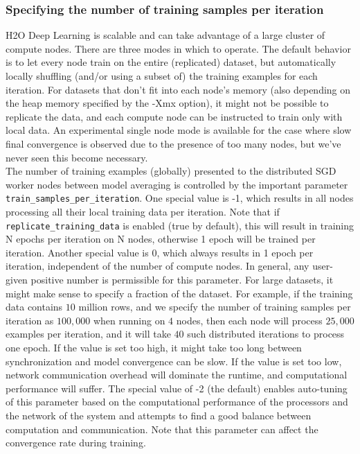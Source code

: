 \documentclass[11pt]{article}
\begin{document}
\subsubsection{Specifying the number of training samples per iteration} \label{2.2.4}
H2O Deep Learning is scalable and can take advantage of a large cluster of compute nodes. There are three modes in which to operate. The default behavior is to let every node train on the entire (replicated) dataset, but automatically locally shuffling (and/or using a subset of) the training examples for each iteration. For datasets that don't fit into each node's memory (also depending on the heap memory specified by the -Xmx option), it might not be possible to replicate the data, and each compute node can be instructed to train only with local data. An experimental single node mode is available for the case where slow final convergence is observed due to the presence of too many nodes, but we've never seen this become necessary.
\\
The number of training examples (globally) presented to the distributed SGD worker nodes between model averaging is controlled by the important parameter \texttt{train\_samples\_per\_iteration}. One special value is -1, which results in all nodes processing all their local training data per iteration. Note that if \texttt{replicate\_training\_data} is enabled (true by default), this will result in training N epochs per iteration on N nodes, otherwise 1 epoch will be trained per iteration. Another special value is 0, which always results in 1 epoch per iteration, independent of the number of compute nodes. In general, any user-given positive number is permissible for this parameter. For large datasets, it might make sense to specify a fraction of the dataset. For example, if the training data contains $10$ million rows, and we specify the number of training samples per iteration as $100,000$ when running on $4$ nodes, then each node will process $25,000$ examples per iteration, and it will take $40$ such distributed iterations to process one epoch. If the value is set too high, it might take too long between synchronization and model convergence can be slow.  If the value is set too low, network communication overhead will dominate the runtime, and computational performance will suffer. The special value of -2 (the default) enables auto-tuning of this parameter based on the computational performance of the processors and the network of the system and attempts to find a good balance between computation and communication. Note that this parameter can affect the convergence rate during training.
\\
\noindent
\end{document}
